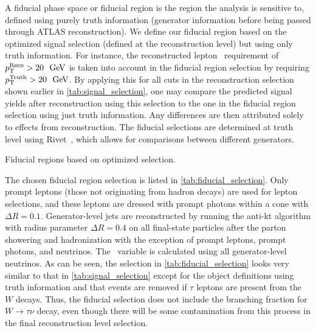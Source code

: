 A fiducial phase space or fiducial region is the 
region the analysis is sensitive to, defined 
using purely truth information (generator information before
being passed through ATLAS reconstruction).
We define our fiducial region
based on the optimized signal selection (defined at the reconstruction level)
but using only truth information. For instance, the reconstructed
lepton \pt~requirement of 
$\pt^{\textrm{Reco}} > 20~\GeV$
is taken into account in the fiducial region selection
by requiring 
$\pt^{\textrm{Truth}} > 20~\GeV$.
By applying this for all cuts in the reconstruction selection
shown earlier in \tab\ref{tab:signal_selection},
one may compare the predicted signal yields after reconstruction
using this selection to the one in the fiducial region selection
using just truth information. Any differences are then attributed solely
to effects from reconstruction. 
The fiducial selections are determined at truth level 
using Rivet~\cite{Buckley:2010ar}, which allows for 
comparisons between different generators.


\begin{table}[ht!]
\centering
\begin{small}

\end{small}
\caption{Fiducial regions based on optimized selection.}
\label{tab:fiducial_selection}
\end{table}

The chosen fiducial region selection 
is listed in \tab\ref{tab:fiducial_selection}.
Only prompt leptons (those not originating from hadron decays) are used for 
lepton selections, and these leptons are dressed with prompt photons 
within a cone with $\Delta R = 0.1$. Generator-level jets are 
reconstructed by running the anti-kt algorithm with radius 
parameter $\Delta R = 0.4$ on all final-state particles 
after the parton showering and hadronization with the exception of prompt 
leptons, prompt photons, and neutrinos. The \MET~variable is calculated 
using all generator-level neutrinos. 
As can be seen, the selection 
in \tab\ref{tab:fiducial_selection} looks very similar to that in 
\tab\ref{tab:signal_selection} except for the object definitions
using truth information and that 
events are removed if $\tau$ leptons are present from the $W$ decays.  
Thus, the fiducial selection
does not include the branching fraction for $W\rightarrow\tau\nu$ decay, 
even though there will be some contamination from this process in the final 
reconstruction level selection. 



